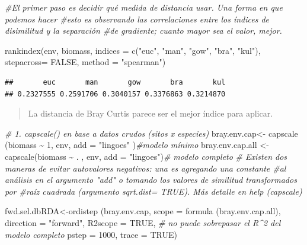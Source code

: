 \documentclass[
]{book}
\newenvironment{Shaded}{\begin{snugshade}}{\end{snugshade}}
\newcommand{\AttributeTok}[1]{\textcolor[rgb]{0.77,0.63,0.00}{#1}}
\newcommand{\CommentTok}[1]{\textcolor[rgb]{0.56,0.35,0.01}{\textit{#1}}}
\newcommand{\ConstantTok}[1]{\textcolor[rgb]{0.00,0.00,0.00}{#1}}
\newcommand{\DecValTok}[1]{\textcolor[rgb]{0.00,0.00,0.81}{#1}}
\newcommand{\FunctionTok}[1]{\textcolor[rgb]{0.00,0.00,0.00}{#1}}
\newcommand{\NormalTok}[1]{#1}
\newcommand{\OtherTok}[1]{\textcolor[rgb]{0.56,0.35,0.01}{#1}}
\newcommand{\SpecialCharTok}[1]{\textcolor[rgb]{0.00,0.00,0.00}{#1}}
\newcommand{\StringTok}[1]{\textcolor[rgb]{0.31,0.60,0.02}{#1}}
\begin{document}
\begin{Shaded}
\begin{Highlighting}[]
\CommentTok{\#El primer paso es decidir qué medida de distancia usar. Una forma en que podemos hacer \#esto es observando las correlaciones entre los índices de disimilitud y la separación \#de gradiente; cuanto mayor sea el valor, mejor.}

\FunctionTok{rankindex}\NormalTok{(env, biomass, }\AttributeTok{indices =} \FunctionTok{c}\NormalTok{(}\StringTok{"euc"}\NormalTok{, }\StringTok{"man"}\NormalTok{, }\StringTok{"gow"}\NormalTok{, }\StringTok{"bra"}\NormalTok{, }\StringTok{"kul"}\NormalTok{), }\AttributeTok{stepacross=} \ConstantTok{FALSE}\NormalTok{, }\AttributeTok{method =} \StringTok{"spearman"}\NormalTok{)}
\end{Highlighting}
\end{Shaded}

\begin{verbatim}
##       euc       man       gow       bra       kul 
## 0.2327555 0.2591706 0.3040157 0.3376863 0.3214870
\end{verbatim}

\begin{quote}
La distancia de Bray Curtis parece ser el mejor índice para aplicar.
\end{quote}

\begin{Shaded}
\begin{Highlighting}[]
\CommentTok{\# 1. capscale() en base a datos crudos (sitos x especies)}
\NormalTok{bray.env.cap}\OtherTok{\textless{}{-}} \FunctionTok{capscale}\NormalTok{ (biomass }\SpecialCharTok{\textasciitilde{}} \DecValTok{1}\NormalTok{, env, }\AttributeTok{add =} \StringTok{"lingoes"}\NormalTok{ )}\CommentTok{\#modelo mínimo}
\NormalTok{bray.env.cap.all }\OtherTok{\textless{}{-}} \FunctionTok{capscale}\NormalTok{(biomass }\SpecialCharTok{\textasciitilde{}}\NormalTok{ . , env, }\AttributeTok{add =} \StringTok{"lingoes"}\NormalTok{)}\CommentTok{\# modelo completo}
\CommentTok{\# Existen dos maneras de evitar autovalores negativos: una es agregando una constante \#al análisis en el argumento "add" o tomando los valores de similitud transformados por \#raíz cuadrada (argumento sqrt.dist= TRUE). Más detalle en help (capscale)}

\NormalTok{fwd.sel.dbRDA}\OtherTok{\textless{}{-}}\FunctionTok{ordistep}\NormalTok{ (bray.env.cap, }\AttributeTok{scope =} \FunctionTok{formula}\NormalTok{ (bray.env.cap.all), }\AttributeTok{direction =} \StringTok{"forward"}\NormalTok{, }\AttributeTok{R2scope =} \ConstantTok{TRUE}\NormalTok{, }\CommentTok{\# no puede sobrepasar el R\^{}2 del modelo completo}
\AttributeTok{pstep =} \DecValTok{1000}\NormalTok{,}
\AttributeTok{trace =} \ConstantTok{TRUE}\NormalTok{)}
\end{Highlighting}
\end{Shaded}
\end{document}
